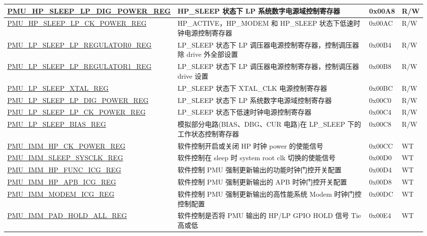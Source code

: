 \begin{longtable}{ | p{6.5cm} | p{8cm} | p{1.3cm} | p{1cm} | }
\hyperref[regdesc:PMUHPSLEEPLPDIGPOWERREG]{PMU\_HP\_SLEEP\_LP\_DIG\_POWER\_REG} & HP\_SLEEP 状态下 LP 系统数字电源域控制寄存器 & 0x00A8 & R/W \\ \hline
\hyperref[regdesc:PMUHPSLEEPLPCKPOWERREG]{PMU\_HP\_SLEEP\_LP\_CK\_POWER\_REG} & HP\_ACTIVE，HP\_MODEM 和 HP\_SLEEP 状态下低速时钟电源控制寄存器 & 0x00AC & R/W \\ \hline
\hyperref[regdesc:PMULPSLEEPLPREGULATOR0REG]{PMU\_LP\_SLEEP\_LP\_REGULATOR0\_REG} & LP\_SLEEP 状态下 LP 调压器电源控制寄存器，控制调压器除 drive 外全部设置 & 0x00B4 & R/W \\ \hline
\hyperref[regdesc:PMULPSLEEPLPREGULATOR1REG]{PMU\_LP\_SLEEP\_LP\_REGULATOR1\_REG} & LP\_SLEEP 状态下 LP 调压器电源控制寄存器，控制调压器 drive 设置 & 0x00B8 & R/W \\ \hline
\hyperref[regdesc:PMULPSLEEPXTALREG]{PMU\_LP\_SLEEP\_XTAL\_REG} & LP\_SLEEP 状态下 XTAL\_CLK 电源控制寄存器 & 0x00BC & R/W \\ \hline
\hyperref[regdesc:PMULPSLEEPLPDIGPOWERREG]{PMU\_LP\_SLEEP\_LP\_DIG\_POWER\_REG} & LP\_SLEEP 状态下 LP 系统数字电源域控制寄存器 & 0x00C0 & R/W \\ \hline
\hyperref[regdesc:PMULPSLEEPLPCKPOWERREG]{PMU\_LP\_SLEEP\_LP\_CK\_POWER\_REG} & LP\_SLEEP 状态下低速时钟电源控制寄存器 & 0x00C4 & R/W \\ \hline
\hyperref[regdesc:PMULPSLEEPBIASREG]{PMU\_LP\_SLEEP\_BIAS\_REG} & 模拟部分电路(BIAS、DBG、CUR 电路)在 LP\_SLEEP 下的工作状态控制寄存器 & 0x00C8 & R/W \\ \hline
\hyperref[regdesc:PMUIMMHPCKPOWERREG]{PMU\_IMM\_HP\_CK\_POWER\_REG} & 软件控制开启或关闭 HP 时钟 power 的使能信号 & 0x00CC & WT \\ \hline
\hyperref[regdesc:PMUIMMSLEEPSYSCLKREG]{PMU\_IMM\_SLEEP\_SYSCLK\_REG} & 软件控制在 sleep 时 system root clk 切换的使能信号 & 0x00D0 & WT \\ \hline
\hyperref[regdesc:PMUIMMHPFUNCICGREG]{PMU\_IMM\_HP\_FUNC\_ICG\_REG} & 软件控制 PMU 强制更新输出的功能时钟门控开关配置 & 0x00D4 & WT \\ \hline
\hyperref[regdesc:PMUIMMHPAPBICGREG]{PMU\_IMM\_HP\_APB\_ICG\_REG} & 软件控制 PMU 强制更新输出的 APB 时钟门控开关配置 & 0x00D8 & WT \\ \hline
\hyperref[regdesc:PMUIMMMODEMICGREG]{PMU\_IMM\_MODEM\_ICG\_REG} & 软件控制 PMU 强制更新输出的高性能系统 Modem 时钟门控控制配置 & 0x00DC & WT \\ \hline
\hyperref[regdesc:PMUIMMPADHOLDALLREG]{PMU\_IMM\_PAD\_HOLD\_ALL\_REG} & 软件控制是否将 PMU 输出的 HP/LP GPIO HOLD 信号 Tie 高或低 & 0x00E4 & WT \\ \hline

\end{longtable}
